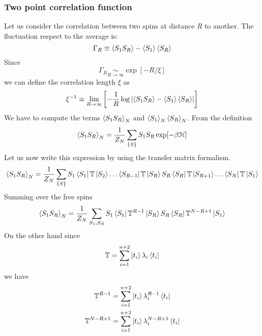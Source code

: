 \documentclass[../main/main.tex]{subfiles}
\begin{document}
\subsubsection{Two point correlation function}
Let us consider the correlation between two spins at distance \emph{R} to another. The fluctuation respect to the average is:
\begin{equation}
  \Gamma _R \equiv  \expval{S_1 S_R} - \expval{S_1}\expval{S_R}
\end{equation}
Since
\begin{equation}
  \Gamma _R \underset{R \rightarrow \infty }{\sim } \exp [-R/\xi ]
\end{equation}
we can define the correlation length \( \xi  \) as
\begin{equation}
  \xi^{-1} \equiv  \lim_{R \rightarrow \infty } \qty[ - \frac{1}{R} \log{ \qty| \expval{S_1 S_R} - \expval{S_1}\expval{S_R}| } ]
\end{equation}
We have to compute the terms \( \expval{S_1 S_R}_N  \) and \( \expval{S_1}_N\expval{S_R}_N \).
From the definition
\begin{equation}
  \expval{S_1 S_R}_N = \frac{1}{Z_N} \sum_{\{ S \}  }^{} S_1 S_R \exp [-\beta \mathcal{H}]
\end{equation}
Let us now write this expression by using the transfer matrix formalism.
\begin{equation}
\expval{S_1 S_R}_N  = \frac{1}{Z_N} \sum_{\{ S \}  }^{} S_1 \bra{S_1} \mathbb{T} \ket{S_2} \dots  \bra{S_{R-1}} \mathbb{T} \ket{S_R} S_R \bra{S_R} \mathbb{T} \ket{S_{R+1}} \dots \bra{S_N} \mathbb{T} \ket{S_1}
\end{equation}
Summing over the free spins
\begin{equation}
  \expval{S_1 S_R}_N = \frac{1}{Z_N} \sum_{S_1,S_R}^{} S_1 \bra{S_1} \mathbb{T}^{R-1} \ket{S_R} S_R \bra{S_R} \mathbb{T}^{N-R+1} \ket{S_1}
  \label{eq:7_1}
\end{equation}
On the other hand since
\begin{equation}
  \mathbb{T} = \sum_{i=1}^{n+2} \ket{t_i} \lambda _i  \bra{t_i}
\end{equation}
we have
\begin{subequations}
\begin{align}
  \mathbb{T}^{R-1} &= \sum_{i=1}^{n+2} \ket{t_i} \lambda _i^{R-1}  \bra{t_i} \\
    \mathbb{T}^{N-R+1} &= \sum_{i=1}^{n+2} \ket{t_i} \lambda _i^{N-R+1}  \bra{t_i}
\end{align}
\end{subequations}
\end{document}
